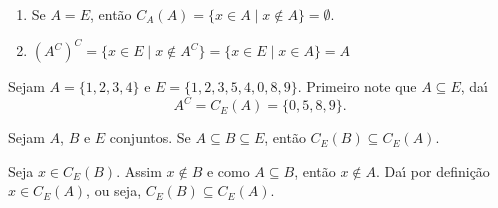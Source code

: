 \begin{observacoes}
    \begin{enumerate}[label={\arabic*})]
        \item Se $A = E$, ent{\~a}o $C_A(A) = \{ x \in A \mid x \notin A \} = \emptyset$.
        \item $(A^C)^C = \{x \in E \mid x \notin A^C\} = \{ x \in E \mid x \in A \} = A$
    \end{enumerate}

\end{observacoes}

\begin{exemplo}
    Sejam $A = \{1,2,3,4\}$ e $E = \{1,2,3,5,4,0,8,9\}$. Primeiro note que $A \subseteq E$, da{\'\i}
    \[
            A^C = C_E(A) = \{0,5,8,9\}.
    \]
\end{exemplo}

\begin{proposicao}
    Sejam $A$, $B$ e $E$ conjuntos. Se $A\subseteq B\subseteq E$, ent{\~a}o $C_E(B)\subseteq C_E(A)$.
\end{proposicao}
\begin{prova}
    Seja $x \in C_E(B)$. Assim $x\notin B$ e como $A \subseteq B$, ent\~ao $x \notin A$. Da{\'\i} por defini\c{c}\~ao $x\in C_E(A)$, ou seja, $C_E(B) \subseteq C_E(A)$.
\end{prova}

